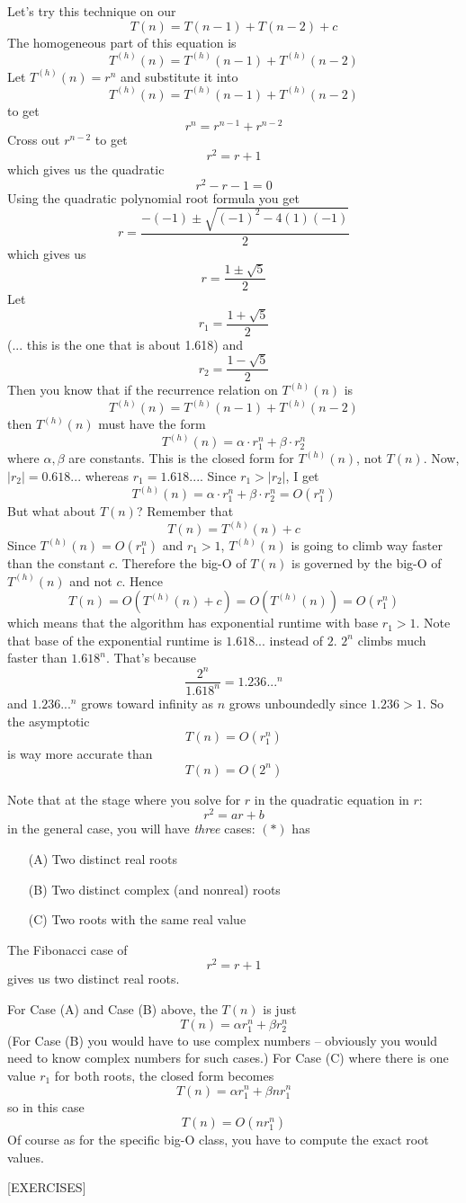 Let's try this technique on our
\[
T(n) = T(n - 1) + T(n - 2) + c
\]
The homogeneous part of this equation is
\[
T^{(h)}(n) = T^{(h)}(n - 1) + T^{(h)}(n - 2)
\]
Let $T^{(h)}(n) = r^n$ and substitute it into
\[
T^{(h)}(n) = T^{(h)}(n - 1) + T^{(h)}(n - 2)
\]
to get
\[
r^n = r^{n - 1} + r^{n - 2}
\]
Cross out $r^{n - 2}$ to get
\[
r^2 = r + 1
\]
which gives us the quadratic
\[
r^2 - r - 1 = 0
\]
Using the quadratic polynomial root formula you get
\[
r = \frac{-(-1) \pm \sqrt{(-1)^2 - 4(1)(-1)} }{2}
\]
which gives us
\[
r = \frac{1 \pm \sqrt{5}}{2}
\]
Let 
\[
r_1 = \frac{1 + \sqrt{5} }{2} 
\]
(... this is the one that is about 1.618)
and 
\[
r_2 = \frac{1 - \sqrt{5} }{2}
\]
Then you know that if the recurrence relation on $T^{(h)}(n)$ is
\[
T^{(h)}(n) = T^{(h)}(n - 1) + T^{(h)}(n - 2)
\]
then $T^{(h)}(n)$ must have the form
\[
T^{(h)}(n) = \alpha \cdot r_1^n + \beta \cdot r_2^n
\]
where $\alpha, \beta$ are constants.
This is the closed form for $T^{(h)}(n)$, not $T(n)$.
Now, $|r_2| = 0.618...$ whereas $r_1 = 1.618...$.
Since $r_1 > |r_2|$, I get 
\[
T^{(h)}(n) = \alpha \cdot r_1^n + \beta \cdot r_2^n = O(r_1^n)
\]
But what about $T(n)$?
Remember that
\[
T(n) = T^{(h)}(n) + c
\]
Since $T^{(h)}(n) = O(r_1^n)$ and $r_1 > 1$,
$T^{(h)}(n)$ is going to climb way faster than the constant $c$.
Therefore the big-O of $T(n)$ is governed by the big-O of
$T^{(h)}(n)$ and not $c$.
Hence
\[
T(n) = O \left( T^{(h)}(n) + c \right) = O \left( T^{(h)}(n) \right) = O(r_1^n)
\]
which means that the algorithm has exponential runtime with base $r_1 > 1$.
Note that 
base of the exponential runtime is $1.618...$ instead of $2$.
$2^n$ climbs much faster than $1.618^n$.
That's because
\[
\frac{2^n}{1.618^n} = 1.236...^n
\]
and $1.236...^n$ grows toward infinity as $n$ grows unboundedly
since $1.236 > 1$.
So the asymptotic
\[
T(n) = O(r_1^n)
\]
is way more accurate than
\[
T(n) = O(2^n)
\]

Note that at the stage where you solve for $r$ in 
the quadratic equation in $r$:
\[
r^2 = ar + b \tag{*}
\]
in the general case, 
you will have \textit{three} cases: $(*)$ has
\begin{enumerate}
\item[(A)] Two distinct real roots
\item[(B)] Two distinct complex (and nonreal) roots
\item[(C)] Two roots with the same real value
\end{enumerate}
The Fibonacci case of 
\[
r^2 = r + 1
\]
gives us two distinct real roots.

For Case (A) and Case (B) above, the $T(n)$ is just
\[
T(n) = \alpha r_1^n + \beta r_2^n
\]
(For Case (B) you would have to use complex
numbers -- obviously you would need to know complex numbers for such cases.)
For Case (C) where there is one value $r_1$ for both roots,
the closed form becomes
\[
T(n) = \alpha r_1^n + \beta nr_1^n
\]
so in this case
\[
T(n) = O(nr_1^n)
\]
Of course as for the specific big-O class, you have to 
compute the exact root values.

[EXERCISES]
